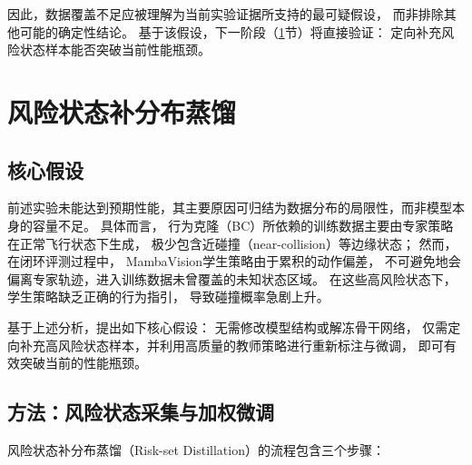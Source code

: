 因此，数据覆盖不足应被理解为当前实验证据所支持的最可疑假设，
而非排除其他可能的确定性结论。
基于该假设，下一阶段（\ref{sec:ch5_riskset}节）将直接验证：
定向补充风险状态样本能否突破当前性能瓶颈。

\FloatBarrier


\section{风险状态补分布蒸馏}
\label{sec:ch5_riskset}

\subsection{核心假设}

前述实验未能达到预期性能，其主要原因可归结为数据分布的局限性，而非模型本身的容量不足。
具体而言，
行为克隆（BC）所依赖的训练数据主要由专家策略在正常飞行状态下生成，
极少包含近碰撞（near-collision）等边缘状态；
然而，在闭环评测过程中，
MambaVision学生策略由于累积的动作偏差，
不可避免地会偏离专家轨迹，进入训练数据未曾覆盖的未知状态区域。
在这些高风险状态下，
学生策略缺乏正确的行为指引，
导致碰撞概率急剧上升。

基于上述分析，提出如下核心假设：
无需修改模型结构或解冻骨干网络，
仅需定向补充高风险状态样本，并利用高质量的教师策略进行重新标注与微调，
即可有效突破当前的性能瓶颈。

\subsection{方法：风险状态采集与加权微调}

风险状态补分布蒸馏（Risk-set Distillation）的流程包含三个步骤：

